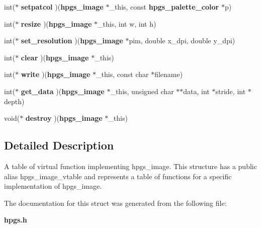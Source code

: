 \begin{DoxyCompactItemize}
\item 
int($\ast$ {\bfseries setpatcol} )({\bf hpgs\_\-image} $\ast$\_\-this, const {\bf hpgs\_\-palette\_\-color} $\ast$p)\label{structhpgs__image__vtable__st_ab92201524525b754e22872a248a58958}

\item 
int($\ast$ {\bfseries resize} )({\bf hpgs\_\-image} $\ast$\_\-this, int w, int h)\label{structhpgs__image__vtable__st_ab1b3310531a2831373acb9459df372a4}

\item 
int($\ast$ {\bfseries set\_\-resolution} )({\bf hpgs\_\-image} $\ast$pim, double x\_\-dpi, double y\_\-dpi)\label{structhpgs__image__vtable__st_ad9613cc4a25ec8a2fe272ac8b380bbf0}

\item 
int($\ast$ {\bfseries clear} )({\bf hpgs\_\-image} $\ast$\_\-this)\label{structhpgs__image__vtable__st_acccf9768631d2c6ded02d8f2633861bb}

\item 
int($\ast$ {\bfseries write} )({\bf hpgs\_\-image} $\ast$\_\-this, const char $\ast$filename)\label{structhpgs__image__vtable__st_a034a89fd29ab03949817321634dfe21e}

\item 
int($\ast$ {\bfseries get\_\-data} )({\bf hpgs\_\-image} $\ast$\_\-this, unsigned char $\ast$$\ast$data, int $\ast$stride, int $\ast$depth)\label{structhpgs__image__vtable__st_a61d55162ee7390120e268f9756f363ec}

\item 
void($\ast$ {\bfseries destroy} )({\bf hpgs\_\-image} $\ast$\_\-this)\label{structhpgs__image__vtable__st_a4ce669ffc871826e2481dff1e0aa8c4f}

\end{DoxyCompactItemize}


\subsection{Detailed Description}
A table of virtual function implementing {\ttfamily hpgs\_\-image}. This structure has a public alias {\ttfamily hpgs\_\-image\_\-vtable} and represents a table of functions for a specific implementation of {\ttfamily hpgs\_\-image}. 

The documentation for this struct was generated from the following file:\begin{DoxyCompactItemize}
\item 
{\bf hpgs.h}\end{DoxyCompactItemize}
